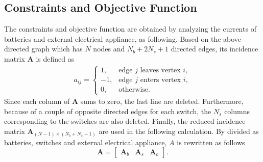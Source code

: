 \documentclass{article}
\begin{document}
\subsection{Constraints and Objective Function}

The constraints and objective function are obtained by analyzing the currents of batteries and external electrical appliance, as following.
Based on the above directed graph which has $N$ nodes and $N_b+2N_s+1$ directed edges, its incidence matrix $\bm{A}$ is defined as
\begin{align}\label{eq:A}
    a_{ij}=
    \begin{cases}
        1,  & \text{edge  $j$ leaves vertex $i$},\\
        -1, & \text{edge $j$ enters vertex $i$},\\
        0,  & \text{otherwise}.
    \end{cases}
\end{align}
Since each column of $\bm{A}$ sums to zero, the last line are deleted.
Furthermore, because of a couple of opposite directed edges for each switch, the $N_s$ columns corresponding to the switches are also deleted.
Finally, the reduced incidence matrix $\bm{A}_{(N-1)\times(N_b+N_s+1)}$ are used in the following calculation.
By divided as batteries, switches and external electrical appliance, $A$ is rewritten as follows
\begin{equation}
    \bm{A} =
    \begin{bmatrix}
        \bm{A}_b & \bm{A}_s & \bm{A}_o
    \end{bmatrix}.
\end{equation}
\end{document}
